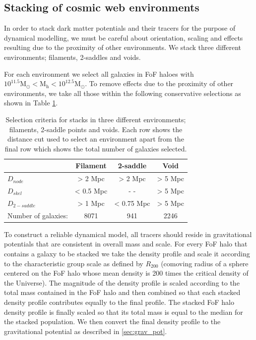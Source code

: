 \subsection{Stacking of cosmic web environments} \label{sec:stacking}
In order to stack dark matter potentials and their tracers for the purpose of dynamical modelling, we must be careful about orientation, scaling and effects resulting due to the proximity of other environments. We stack three different environments; filaments, 2-saddles and voids. 

For each environment we select all galaxies in FoF haloes with $\mathrm{10^{11.5} M_{\odot} < M_{h} < 10^{12.5} M_{\odot}}$. To remove effects due to the proximity of other environments, we take all those within the following conservative selections as shown in Table \ref{tab:stacking}. 

\begin{table}
\centering
\begin{tabular}{|l|c|c|c|}
\hline
& Filament & 2-saddle & Void \\ \hline
$D_{node}$ & > 2 Mpc & > 2 Mpc & > 5 Mpc \\
$D_{skel}$ & < 0.5 Mpc  & - - & > 5 Mpc \\
$D_{2-saddle}$ & > 1 Mpc & < 0.75 Mpc & > 5 Mpc \\
Number of galaxies: & 8071 & 941 & 2246 \\
\hline
\end{tabular}
\caption{Selection criteria for stacks in three different environments; filaments, 2-saddle points and voids. Each row shows the distance cut used to select an environment apart from the final row which shows the total number of galaxies selected.}
\label{tab:stacking}
\end{table}

To construct a reliable dynamical model, all tracers should reside in gravitational potentials that are consistent in overall mass and scale. For every FoF halo that contains a galaxy to be stacked we take the density profile and scale it according to the characteristic group scale as defined by $R_{200}$ (comoving radius of a sphere centered on the FoF halo whose mean density is 200 times the critical density of the Universe). The magnitude of the density profile is scaled according to the total mass contained in the FoF halo and then combined so that each stacked density profile contributes equally to the final profile. The stacked FoF halo density profile is finally scaled so that its total mass is equal to the median for the stacked population. We then convert the final density profile to the gravitational potential as described in \ref{sec:grav_pot}.

